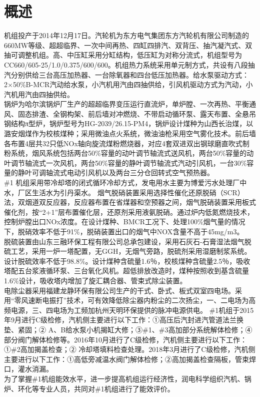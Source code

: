 \documentclass[a4paper, 11pt]{article}
\begin{document}
\section{概述}
机组投产于2014年12月17日。汽轮机为东方电气集团东方汽轮机有限公司制造的660MW等级、超超临界、一次中间再热、四缸四排汽、双背压、抽汽凝汽式、双抽可调整机组。高、中压缸采用分缸结构，低压缸为对称分流式，机组型号为CC660/605-25/1.0/0.375/600/600。机组热力系统采用单元制方式，共设有八段抽汽分别供给三台高压加热器、一台除氧器和四台低压加热器。给水泵驱动方式：2×50\%B-MCR汽动给水泵，小汽机用汽由四抽供给，引风机驱动方式为汽动，小汽机用汽由四抽供给。\\
\indent
锅炉为哈尔滨锅炉厂生产的超超临界变压运行直流炉，单炉膛、一次再热、平衡通风、固态排渣、全钢构架、前后墙对冲燃烧、不带启动循环泵、露天布置、全悬吊钢结构π型炉，锅炉型号为HG-2039/26.15-PM4，锅炉设计煤种为山西长治煤，以潞安烟煤作为校核煤种；采用微油点火系统，微油油枪采用空气雾化技术。前后墙各布置4层共32只低NOx轴向旋流煤粉燃烧器，对应4套双进双出钢球磨直吹式制粉系统，烟风系统包括两台50\%容量的动叶调节轴流式送风机，两台50\%容量的动叶调节轴流式一次风机，两台50\%容量的静叶调节轴流式汽动引风机，一台30\%容量的静叶可调轴流式电动引风机以及两台三分仓回转式空气预热器。\\
\indent
\#1 机组采用带冷却塔的闭式循环冷却方式，发电用水主要为博爱污水处理厂中水，厂区生活水为引丹渠水。
烟气脱硝装置采用选择性催化还原脱硝（SCR）法，双烟道双反应器，反应器布置在省煤器和空预器之间，烟气脱硝装置采用板式催化剂，按“2+1”层布置催化层，还原剂采用液氨脱硝。通过炉内低氮燃烧技术，控制炉膛出口NOx浓度。在设计煤种、BMCR工况下、处理100\%烟气量的情况下，脱硝效率不低于91\%，脱硝装置出口的烟气中NOX含量不高于45mg/m3。\\
\indent
脱硫装置由山东三融环保工程有限公司总承包建设，采用石灰石-石膏湿法烟气脱硫工艺，采用一炉一塔配置，无GGH，无烟气旁路，脱硫剂采用湿磨制浆系统。设计脱硫效率不低于98.8\%。设计煤种含硫量1.6％，校核煤种含硫量2.5％，吸收塔配五台浆液循环泵、三台氧化风机。超低排放改造时，煤种按照收到基含硫量1.6\%设计，吸收塔内增加了旋汇耦合器、管束式除尘装置。\\
\indent
电除尘器采用福建龙静环保有限公司生产的干式、卧式、板式双室四电场。采用“零风速断电振打”技术，可有效降低除尘器内粉尘的二次扬尘，一、二电场为高频电源，三、四电场为工频加杭州天明环保提供的脉冲电源供电。
\#1机组于2015年9月进行C级检修，汽机侧主要进行以下工作：①高压后汽封进汽管道法兰换垫、紧固；② A、B给水泵小机揭缸大修；③\#1、\#3高加部分系统解体检修；④部分阀门解体检修等。2016年10月进行了C级检修，汽机侧主要进行以下工作：①\#2高加揭盖检查；② 冷却塔填料检查处理。2018年3月进行了C级检修，汽机侧主要进行以下工作：①高低旁减温水阀门解体检修；②高加揭盖检查隔板，管束焊口，灌水消漏。\\
\indent
为了掌握\#1机组能效水平，进一步提高机组运行经济性，润电科学组织汽机、锅炉、环化等专业人员，共同对\#1机组进行了能效评价。
\end{document}
